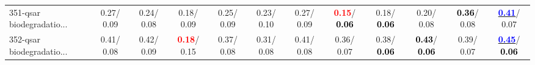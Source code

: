 \begin{table}[h]
\begin{center}
{\begin{tabular}{lc|c|c|c|c|c|c|c|c|c|c}
351-qsar biodegradatio... &   0.27/  0.09 &   0.24/  0.08 &   0.18/  0.09 &   0.25/  0.09 &   0.23/  0.10 &   0.27/  0.09 & \textcolor{red}{\textbf{  0.15}}/\textcolor{black}{\textbf{  0.06}} &   0.18/\textcolor{black}{\textbf{  0.06}} &   0.20/  0.08 & \textcolor{black}{\textbf{  0.36}}/  0.08 & \underline{\textcolor{blue}{\textbf{  0.41}}}/  0.07 \\
352-qsar biodegradatio... &   0.41/  0.08 &   0.42/  0.09 & \textcolor{red}{\textbf{  0.18}}/  0.15 &   0.37/  0.08 &   0.31/  0.08 &   0.41/  0.08 &   0.36/  0.07 &   0.38/\textcolor{black}{\textbf{  0.06}} & \textcolor{black}{\textbf{  0.43}}/\textcolor{black}{\textbf{  0.06}} &   0.39/  0.07 & \underline{\textcolor{blue}{\textbf{  0.45}}}/\textcolor{black}{\textbf{  0.06}} \\\end{tabular}}\label{stratsALCKappa10AllReduxHalfa}
\end{center}
\end{table}
